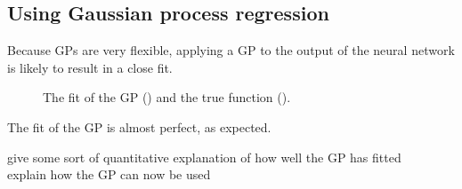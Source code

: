 \subsection{Using Gaussian process regression}

Because \acp{GP} are very flexible, applying a \ac{GP} to the output of the neural network is likely to result in a close fit.

\begin{figure}[htbp]
	\centering
	
	\caption{The fit of the \ac{GP} (\gpcolour) and the true function (\truthcolour).}
	\label{fig:gp-fit}
\end{figure}

The fit of the \ac{GP} is almost perfect, as expected.

\begin{todo}
	give some sort of quantitative explanation of how well the GP has fitted \\
	explain how the GP can now be used
\end{todo}

